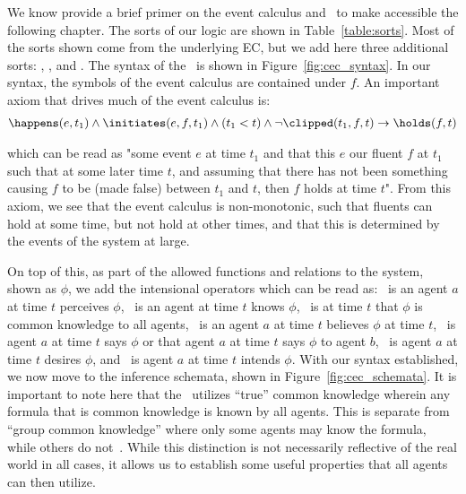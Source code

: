 We know provide a brief primer on the event calculus and \CEC\ to make
accessible the following chapter. The sorts of our logic are shown in 
Table~\ref{table:sorts}. Most of the sorts shown come from the underlying EC,
but we add here three additional sorts: \Agent, \Action, and \ActionType.
The syntax of the \CEC\ is shown in Figure~\ref{fig:cec_syntax}. In our
syntax, the symbols of the event calculus are contained under $\mathit{f}$.
An important axiom that drives much of the event calculus is:
\vspace{-0.4cm}
\begin{equation*}
    \begin{aligned}
        \happens(e, t_{1}) \land \initiates(e, f, t_{1}) \land (t_{1} < t) \land \lnot\clipped(t_{1}, f, t) \rightarrow \holds(f, t)
    \end{aligned}
\end{equation*}

\noindent
which can be read as "some event $e$ \happens at time $t_{1}$ and that this $e$
\initiates our fluent $f$ at $t_1$ such that at some later time $t$, and assuming
that there has not been something causing $f$ to be \clipped (made false) between
$t_{1}$ and $t$, then $f$ holds at time $t$". From this axiom, we see that the
event calculus is non-monotonic, such that fluents can hold at some time, but
not hold at other times, and that this is determined by the events of the
system at large.

On top of this, as part of the allowed functions and relations to the system,
shown as $\mathit{\phi}$, we add the intensional operators which can be read as:
\perceives\ is an agent $a$ at time $t$ perceives $\mathit{\phi}$, \knows\
is an agent at time $t$ knows $\mathit{\phi}$, \common\ is at time $t$ that
$\mathit{\phi}$ is common knowledge to all agents, \believes\ is
an agent $a$ at time $t$ believes $\mathit{\phi}$ at time $t$, \says\ is
agent $a$ at time $t$ says $\mathit{\phi}$ or that agent $a$ at time $t$
says $\mathit{\phi}$ to agent $b$, \desires\ is agent $a$ at time $t$ desires
$\mathit{\phi}$, and \intends\ is agent $a$ at time $t$ intends $\mathit{\phi}$.
With our syntax established, we now move to the inference schemata, shown in
Figure~\ref{fig:cec_schemata}. It is important to note here
that the \CEC\ utilizes ``true'' common knowledge wherein any formula that is common
knowledge is known by all agents. This is separate from ``group common knowledge'' where
only some agents may know the formula, while others do not~\cite{fagin_reasoning_2004}.
While this distinction is
not necessarily reflective of the real world in all cases, it allows us to establish
some useful properties that all agents can then utilize.

